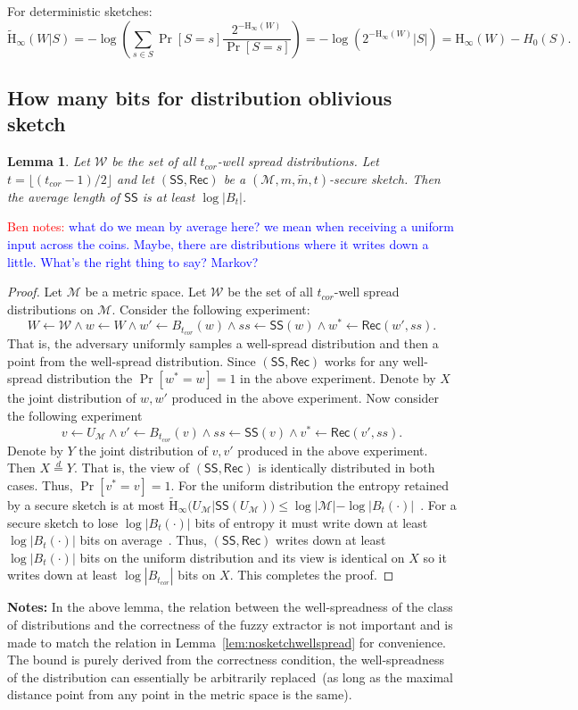 \documentclass[11pt]{article}
\newcommand{\lemref}[1]{\mbox{Lemma~\ref{#1}}}
\newcommand{\class}[1]{{\ensuremath{\mathsf{#1}}}}
\newcommand{\sketch}{\ensuremath{\class{SS}}\xspace}
\newcommand{\rec}{\ensuremath{\class{Rec}}\xspace}
\newcommand{\Hoo}{\mathrm{H}_\infty}
\newcommand{\Hav}{\tilde{\mathrm{H}}_\infty}
\newtheorem{lemma}[theorem]{Lemma}
\newcommand{\authnote}[2]{{\textcolor{red}{\textsf{#1 notes: }\textcolor{blue}{ #2}}\marginpar{\textcolor{red}{\textbf{!!!!!}}}}}
\newcommand{\authnote}[2]{}
\newcommand{\bnote}[1]{{\authnote{Ben}{#1}}}
\begin{document}
For deterministic sketches:
\[
\Hav(W|S ) = -\log \left(\sum_{s\in S} \Pr[S = s] \frac{2^{-\Hoo(W)}}{\Pr[S=s]}\right) = -\log \left(2^{-\Hoo(W)} |S| \right)  = \Hoo(W) - H_0(S).
\]

\subsection{How many bits for distribution oblivious sketch} 
\begin{lemma}
Let $\mathcal{W}$ be the set of all $t_{cor}$-well spread distributions.  Let $t = \lfloor (t_{cor}-1)/2\rfloor$ and let $(\sketch, \rec)$ be a $(\mathcal{M}, m, \tilde{m}, t )$-secure sketch.  Then the average length of $\sketch$ is at least $\log |B_{t}|$.
\end{lemma}
\bnote{what do we mean by average here?  we mean when receiving a uniform input across the coins.  Maybe, there are distributions where it writes down a little.  What's the right thing to say?  Markov?}
\begin{proof}
Let $\mathcal{M}$ be a metric space.
Let $\mathcal{W}$ be the set of all $t_{cor}$-well spread distributions on $\mathcal{M}$.  
Consider the following experiment:
\[
W\leftarrow \mathcal{W} \wedge w \leftarrow W \wedge w'\leftarrow B_{t_{cor}}(w) \wedge ss \leftarrow \sketch(w) \wedge w^* \leftarrow \rec(w', ss).
\]
That is, the adversary uniformly samples a well-spread distribution and then a point from the well-spread distribution.  
Since $(\sketch, \rec)$ works for any well-spread distribution the $\Pr[w^* = w] =1 $ in the above experiment.   Denote by $X$ the joint distribution of $w, w'$ produced in the above experiment.  Now consider the following experiment
\[
v \leftarrow U_{\mathcal{M}} \wedge v'\leftarrow B_{t_{cor}}(v) \wedge ss \leftarrow \sketch(v) \wedge v^* \leftarrow \rec(v', ss).
\]
Denote by $Y$ the joint distribution of $v, v'$ produced in the above experiment.  Then $X\overset{d}= Y$.  That is, the view of $(\sketch, \rec)$ is identically distributed in both cases.  Thus, $\Pr[v^* = v] = 1$.  For the uniform distribution the entropy retained by a secure sketch is at most $\Hav(U_{\mathcal{M}} | \sketch(U_{\mathcal{M}})) \le \log |\mathcal{M}| - \log |B_t(\cdot)|$~\cite[Lemma C.1]{DBLP:journals/siamcomp/DodisORS08}.  For a secure sketch to lose $\log |B_t(\cdot)|$ bits of entropy it must write down at least $\log |B_t(\cdot)|$ bits on average~\cite[Lemma 2.2b]{DBLP:journals/siamcomp/DodisORS08}.  Thus, $(\sketch, \rec)$ writes down at least $\log |B_t(\cdot)|$ bits on the uniform distribution and its view is identical on $X$ so it writes down at least $\log |B_{t_{cor}}|$ bits on $X$.  This completes the proof.
\end{proof}
\noindent
\textbf{Notes:} In the above lemma, the relation between the well-spreadness of the class of distributions and the correctness of the fuzzy extractor is not important and is made to match the relation in \lemref{lem:nosketchwellspread} for convenience.  The bound is purely derived from the correctness condition, the well-spreadness of the distribution can essentially be arbitrarily replaced~(as long as the maximal distance point from any point in the metric space is the same).
\end{document}

